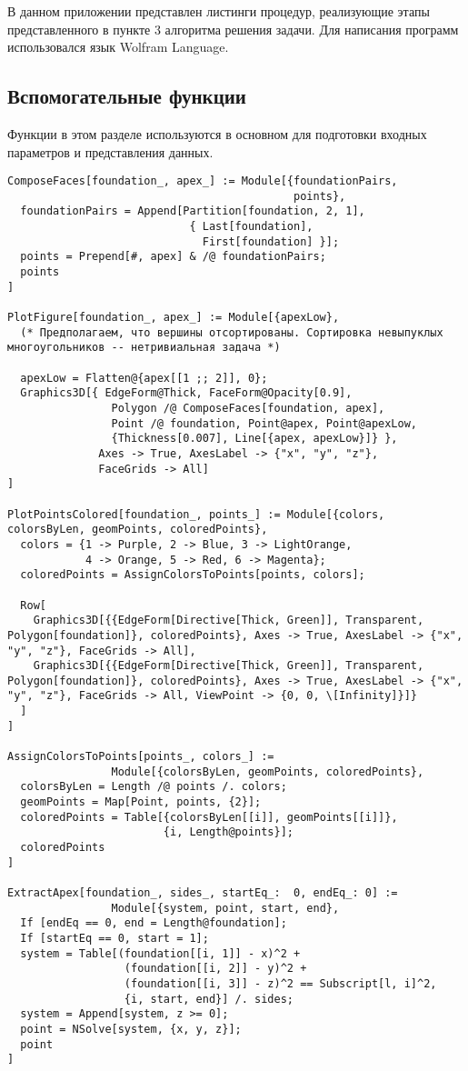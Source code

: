\documentclass[../main.tex]{subfiles}
\begin{document}
\lstset{style=wolfram_mathematica}

В данном приложении представлен листинги процедур, реализующие этапы представленного в пункте 3 алгоритма решения задачи. Для написания программ использовался язык {\ttfamily Wolfram Language}.

\subsection{Вспомогательные функции}
Функции в этом разделе используются в основном для подготовки входных параметров и представления данных.
\begin{lstlisting}
ComposeFaces[foundation_, apex_] := Module[{foundationPairs,
                                            points},
  foundationPairs = Append[Partition[foundation, 2, 1],
                            { Last[foundation],
                              First[foundation] }];
  points = Prepend[#, apex] & /@ foundationPairs;
  points
]

PlotFigure[foundation_, apex_] := Module[{apexLow},
  (* Предполагаем, что вершины отсортированы. Сортировка невыпуклых многоугольников -- нетривиальная задача *)

  apexLow = Flatten@{apex[[1 ;; 2]], 0};
  Graphics3D[{ EdgeForm@Thick, FaceForm@Opacity[0.9],
                Polygon /@ ComposeFaces[foundation, apex],
                Point /@ foundation, Point@apex, Point@apexLow,
                {Thickness[0.007], Line[{apex, apexLow}]} },
              Axes -> True, AxesLabel -> {"x", "y", "z"},
              FaceGrids -> All]
]

PlotPointsColored[foundation_, points_] := Module[{colors, colorsByLen, geomPoints, coloredPoints},
  colors = {1 -> Purple, 2 -> Blue, 3 -> LightOrange,
            4 -> Orange, 5 -> Red, 6 -> Magenta};
  coloredPoints = AssignColorsToPoints[points, colors];

  Row[
    Graphics3D[{{EdgeForm[Directive[Thick, Green]], Transparent, Polygon[foundation]}, coloredPoints}, Axes -> True, AxesLabel -> {"x", "y", "z"}, FaceGrids -> All],
    Graphics3D[{{EdgeForm[Directive[Thick, Green]], Transparent, Polygon[foundation]}, coloredPoints}, Axes -> True, AxesLabel -> {"x", "y", "z"}, FaceGrids -> All, ViewPoint -> {0, 0, \[Infinity]}]}
  ]
]

AssignColorsToPoints[points_, colors_] :=
                Module[{colorsByLen, geomPoints, coloredPoints},
  colorsByLen = Length /@ points /. colors;
  geomPoints = Map[Point, points, {2}];
  coloredPoints = Table[{colorsByLen[[i]], geomPoints[[i]]},
                        {i, Length@points}];
  coloredPoints
]

ExtractApex[foundation_, sides_, startEq_:  0, endEq_: 0] :=
                Module[{system, point, start, end},
  If [endEq == 0, end = Length@foundation];
  If [startEq == 0, start = 1];
  system = Table[(foundation[[i, 1]] - x)^2 +
                  (foundation[[i, 2]] - y)^2 +
                  (foundation[[i, 3]] - z)^2 == Subscript[l, i]^2,
                  {i, start, end}] /. sides;
  system = Append[system, z >= 0];
  point = NSolve[system, {x, y, z}];
  point
]
\end{lstlisting}
\end{document}
